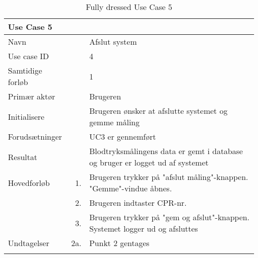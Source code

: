 \begin{longtabu} to  %
    {\large \textbf{Use Case 5}} && \\
    \toprule
    Navn &&    Afslut system\\
    Use case ID &&    4\\
    Samtidige forløb &&    1\\
    Primær aktør &&    Brugeren\\
    Initialisere &&    Brugeren ønsker at afslutte systemet og gemme måling\\
    Forudsætninger && UC3 er gennemført\\
    Resultat &&    Blodtryksmålingens data er gemt i database og bruger er logget ud af systemet                    \\ \midrule
    Hovedforløb &    1. &    Brugeren trykker på "afslut måling"\--knappen. "Gemme"\--vindue åbnes. \\  						 	
                &    2. & Brugeren indtaster CPR-nr. 	\\
                &    3. & Brugeren trykker på "gem og afslut"\--knappen. Systemet logger ud og afsluttes\\ \midrule
                
    Undtagelser &    2a. & Punkt 2 gentages    \\ \bottomrule
\caption{Fully dressed Use Case 5}
\label{UC5}
\end{longtabu}






















